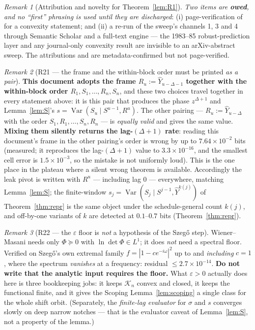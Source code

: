 \documentclass[11pt]{article}
\theoremstyle{definition}
\theoremstyle{remark}
\newtheorem{remark}{Remark}
\begin{document}
\begin{remark}[Attribution and novelty for Theorem~\ref{lem:R1}]
\emph{Two items are \textbf{owed}, and no ``first'' phrasing is used
until they are discharged}: (i) page-verification of \cite{bib:zl26}
for a convexity statement; and (ii) a re-run of the sweep's channels
1, 3 and 4 through Semantic Scholar and a full-text engine --- the
1983--85 robust-prediction layer and any journal-only convexity result
are invisible to an arXiv-abstract sweep. The attributions
\cite{bib:vp84} and \cite{bib:franke85} are metadata-confirmed but not
page-verified.
\end{remark}

\begin{remark}[R21 --- the frame and the within-block order must be
printed \emph{as a pair}]
\label{rem:R21}
\textbf{This document adopts the frame $R_u:=\hat Y_{u-\Delta-1}$
together with the within-block order $R_1,S_1,\dots,R_n,S_n$}, and
these two choices travel together in every statement above: it is this
pair that produces the phase $z^{\Delta+1}$ and Lemma~\ref{lem:S}'s
$s=\operatorname{Var}(S_u\mid S^{u-1},R^{u})$. The other pairing ---
$R_u:=\hat Y_{u-\Delta}$ with the order $S_1,R_1,\dots,S_n,R_n$ --- is
\emph{equally valid} and gives the same value. \textbf{Mixing them
silently returns the lag-$(\Delta+1)$ rate}: reading this document's
frame in the other pairing's order is wrong by up to
$7.64\times10^{-2}$ bits (measured; it reproduces the
lag-$(\Delta+1)$ value to $3.3\times10^{-16}$, and the smallest cell
error is $1.5\times10^{-3}$, so the mistake is not uniformly loud).
This is the one place in the plateau where a silent wrong theorem is
available. Accordingly the leak pivot is written with $R^{u}$ ---
including lag $0$ --- everywhere, matching Lemma~\ref{lem:S}; the
finite-window $s_j=\operatorname{Var}(S_j\mid S^{j-1},\hat Y^{k(j)})$
of Theorem~\ref{thm:repr} is the same object under the
schedule-general count $k(j)$, and off-by-one variants of $k$ are
detected at $0.1$--$0.7$ bits (Theorem~\ref{thm:repr}).
\end{remark}

\begin{remark}[R22 --- the $\varepsilon$ floor is \emph{not} a
hypothesis of the Szeg\H o step]
\label{rem:R22}
Wiener--Masani \cite{bib:wm57,bib:wm58,bib:hl58} needs only
$\Phi\succeq0$ with $\ln\det\Phi\in L^1$; it
does \emph{not} need a spectral floor. Verified on Szeg\H o's own
extremal family $f=|1-ce^{-i\omega}|^2$ up to and \emph{including}
$c=1$, where the spectrum \emph{vanishes} at a frequency: residual
$\le2.7\times10^{-14}$. \textbf{Do not write that the analytic input
requires the floor.} What $\varepsilon>0$ actually does here is three
bookkeeping jobs: it keeps $\mathcal K_n$ convex and closed, it keeps
the functional finite, and it gives the Scoping
Lemma~\ref{lem:scoping} a single class for the whole shift orbit.
(Separately, the \emph{finite-lag evaluator} for $\sigma$ and $s$
converges slowly on deep narrow notches --- that is the evaluator
caveat of Lemma~\ref{lem:S}, not a property of the lemma.)
\end{remark}
\end{document}
